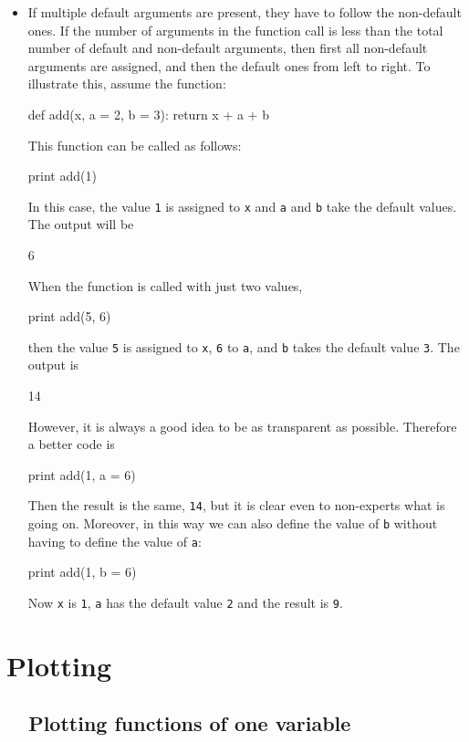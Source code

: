 \begin{itemize}
\begin{bluecode}
\end{bluecode}
\item If multiple default arguments are present, they have to follow the non-default ones.
      If the number of arguments in the function call is less than the total number of default and non-default
      arguments, then first all non-default arguments are assigned, and then the default ones from 
      left to right. To illustrate this, assume the function:
\begin{bluecode}
def add(x, a = 2, b = 3):
    return x + a + b
\end{bluecode}
This function can be called as follows:
\begin{bluecode}
print add(1)
\end{bluecode}
In this case, the value {\tt 1} is assigned to {\tt x} and {\tt a} and {\tt b} take the default values.
The output will be 
\begin{bluecode}
6
\end{bluecode}
When the function is called with just two values,
\begin{bluecode}
print add(5, 6)
\end{bluecode}
then the value {\tt 5} is assigned to {\tt x}, {\tt 6} to {\tt a}, and {\tt b} takes the default value {\tt 3}.
The output is
\begin{bluecode}
14
\end{bluecode}
However, it is always a good idea to be as transparent as possible. Therefore a better code is 
\begin{bluecode}
print add(1, a = 6)
\end{bluecode}
Then the result is the same, {\tt 14}, but it is clear even to non-experts what is going on. Moreover,
in this way we can also define the value of {\tt b} without having to define the value of {\tt a}:
\begin{bluecode}
print add(1, b = 6)
\end{bluecode}
Now {\tt x} is {\tt 1}, {\tt a} has the default value {\tt 2} and the result is {\tt 9}.
\end{itemize}


\section{Plotting} \label{sec:plotting}

\subsection{\ \ Plotting functions of one variable}\label{plotting}

